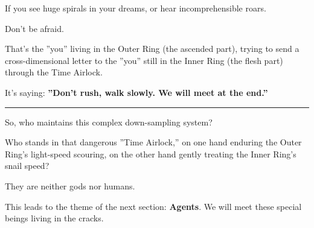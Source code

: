 If you see huge spirals in your dreams, or hear incomprehensible roars.

Don't be afraid.

That's the ''you'' living in the Outer Ring (the ascended part), trying to send a cross-dimensional letter to the ''you'' still in the Inner Ring (the flesh part) through the Time Airlock.

It's saying: \textbf{''Don't rush, walk slowly. We will meet at the end.''}

\hrule

So, who maintains this complex down-sampling system?

Who stands in that dangerous ''Time Airlock,'' on one hand enduring the Outer Ring's light-speed scouring, on the other hand gently treating the Inner Ring's snail speed?

They are neither gods nor humans.

This leads to the theme of the next section: \textbf{Agents}. We will meet these special beings living in the cracks.

